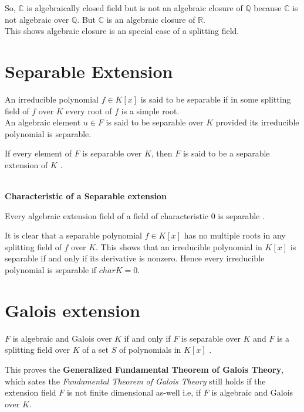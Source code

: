 So, \(\mathbb{C}\) is algebraically closed field but is not an algebraic closure of \(\mathbb{Q}\) because \(\mathbb{C}\) is not algebraic over \(\mathbb{Q}\).
But \(\mathbb{C}\) is an algebraic closure of \(\mathbb{R}\).\\
This shows algebraic closure is an special case of a splitting field.

\section{Separable Extension}
An irreducible polynomial \(f \in K[x]\) is said to be separable if in some splitting field of \(f\) over \(K\) every root of \(f\) is a simple root.\\
An algebraic element \(u \in F\) is said to be separable over \(K\) provided its irreducible polynomial is separable.
\begin{definition}
  If every element of \(F\) is separable over \(K\), then \(F\) is said to be a separable extension of \(K\) \cite{hunger}.\\ \\
\end{definition}
\noindent
\textbf{Characteristic of a Separable extension}
\begin{remark}
  Every algebraic extension field of a field of characteristic \(0\) is separable \cite{hunger}.
  \end{remark}

It is clear that a separable polynomial \(f \in K[x]\) has no multiple roots in any splitting field of \(f\) over \(K\). This shows that an irreducible polynomial in \(K[x]\) is separable if and only if its derivative is nonzero. Hence every irreducible polynomial is separable if \(char K = 0\).


\section{Galois extension}
\begin{theorem}
  \(F\) is algebraic and Galois over \(K\) if and only if \(F\) is separable over \(K\) and \(F\) is a splitting field over \(K\) of a set \(S\) of polynomials in \(K[x]\) \cite{hunger}.\\
  \end{theorem}

This proves the \textbf{Generalized Fundamental Theorem of Galois Theory},\\
which sates the \textit{Fundamental Theorem of Galois Theory} still holds if the extension field \(F\) is not finite dimensional as-well i.e, if \(F\) is algebraic and Galois over \(K\).
